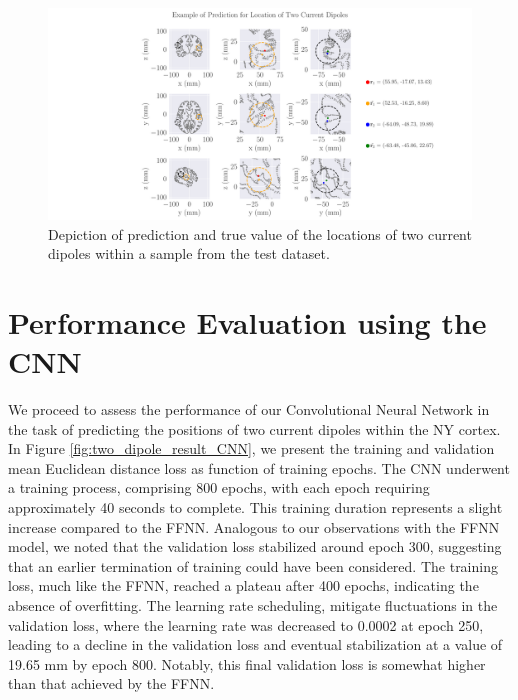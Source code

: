\documentclass[a4paper, UKenglish, 11pt]{uiomaster}
\begin{document}
\begin{figure}[!htb]
  \hspace*{-4.5cm}
    \centering
    \includegraphics[width=20cm]{figures/NN_two_dipole/two_dipoles_prediction.pdf}
    \caption{Depiction of prediction and true value of the locations of two current dipoles within a sample from the test dataset.}
    \label{fig:two_dipole_result}
\end{figure}

\FloatBarrier


\section{Performance Evaluation using the CNN}

We proceed to assess the performance of our Convolutional Neural Network in the task of predicting the positions of two current dipoles within the NY cortex. In Figure \ref{fig:two_dipole_result_CNN}, we present the training and validation mean Euclidean distance loss as function of training epochs. The CNN underwent a training process, comprising 800 epochs, with each epoch requiring approximately 40 seconds to complete. This training duration represents a slight increase compared to the FFNN. Analogous to our observations with the FFNN model, we noted that the validation loss stabilized around epoch 300, suggesting that an earlier termination of training could have been considered. The training loss, much like the FFNN, reached a plateau after 400 epochs, indicating the absence of overfitting. The learning rate scheduling, mitigate fluctuations in the validation loss, where the learning rate was decreased to 0.0002 at epoch 250, leading to a decline in the validation loss and eventual stabilization at a value of 19.65 mm by epoch 800. Notably, this final validation loss is somewhat higher than that achieved by the FFNN.
\end{document}
